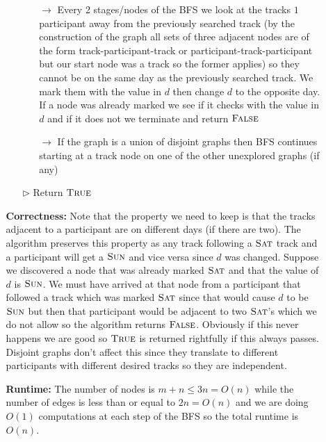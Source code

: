 \documentclass[12pt,twoside]{article}
\begin{document}
\begin{problems}
\begin{itemize}
\begin{itemize}
\begin{itemize}
\begin{itemize}
\item[$\rightarrow$] Every 2 stages/nodes of the BFS we look at the tracks $1$ participant away from the previously searched track (by the construction of the graph all sets of three adjacent nodes are of the form track-participant-track or participant-track-participant but our start node was a track so the former applies) so they cannot be on the same day as the previously searched track. We mark them with the value in $d$ then change $d$ to the opposite day. If a node was already marked we see if it checks with the value in $d$ and if it does not we terminate and return $\textsc{False}$
\item[$\rightarrow$] If the graph is a union of disjoint graphs then BFS continues starting at a track node on one of the other unexplored graphs (if any)
\end{itemize}
\item[$\rhd$] Return $\textsc{True}$
\end{itemize}
\end{itemize}
\begin{itemize}
\item [\textbf{Correctness:} ] Note that the property we need to keep is that the tracks adjacent to a participant are on different days (if there are two). The algorithm preserves this property as any track following a $\textsc{Sat}$ track and a participant will get a $\textsc{Sun}$ and vice versa since $d$ was changed. Suppose we discovered a node that was already marked $\textsc{Sat}$ and that the value of $d$ is $\textsc{Sun}$. We must have arrived at that node from a participant that followed a track which was marked $\textsc{Sat}$ since that would cause $d$ to be $\textsc{Sun}$ but then that participant would be adjacent to two $\textsc{Sat}$'s which we do not allow so the algorithm returns $\textsc{False}$. Obviously if this never happens we are good so $\textsc{True}$ is returned rightfully if this always passes. Disjoint graphs don't affect this since they translate to different participants with different desired tracks so they are independent.
\end{itemize}
\begin{itemize}
\item [\textbf{Runtime:} ] The number of nodes is $m+n\leq 3n = O(n)$ while the number of edges is less than or equal to $2n=O(n)$ and we are doing $O(1)$ computations at each step of the BFS so the total runtime is $O(n)$.
\end{itemize}
\end{itemize}

\end{problems}
\end{document}
